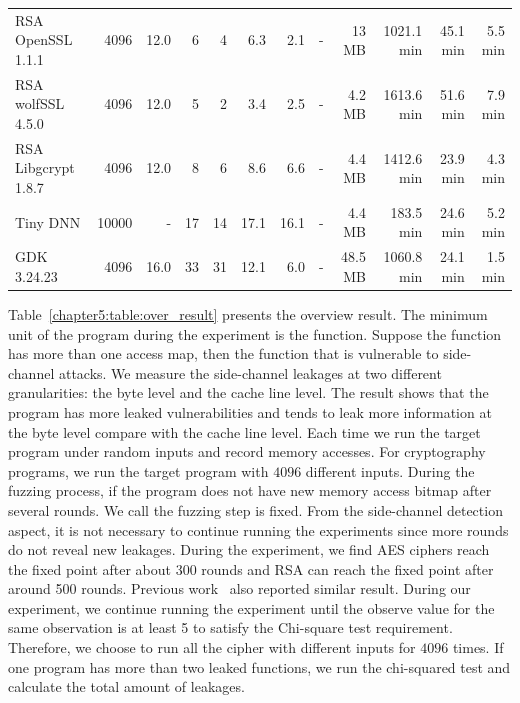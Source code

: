 \begin{table}
{\begin{tabular}{lrrrrrrrrrrr}
RSA OpenSSL 1.1.1& 4096 & 12.0 &6&4&6.3& 2.1&-&13 MB & 1021.1 min & 45.1 min & 5.5 min\\
RSA wolfSSL 4.5.0& 4096 & 12.0 &5&2&3.4& 2.5&-&4.2 MB & 1613.6 min & 51.6 min & 7.9 min\\
RSA Libgcrypt 1.8.7& 4096 & 12.0 &8&6&8.6& 6.6&-&4.4 MB & 1412.6 min & 23.9 min & 4.3 min\\
Tiny DNN & 10000 & - & 17&14&17.1&16.1&-& 4.4 MB & 183.5 min & 24.6 min & 5.2 min\\
GDK 3.24.23 & 4096 & 16.0 & 33&31& 12.1& 6.0&-& 48.5 MB & 1060.8 min & 24.1 min & 1.5 min\\
\bottomrule
\end{tabular}
}

\end{table}

Table~\ref{chapter5:table:over_result} presents the overview result. The minimum unit of the program during the experiment is the function. Suppose the function has more than one access map, then the function that is vulnerable to side-channel attacks. We measure the side-channel leakages at two different granularities: the byte level and the cache line level. The result shows that the program has more leaked vulnerabilities and tends to leak more information at the byte level compare with the cache line level. Each time we run the target program under random inputs and record memory accesses. For cryptography programs, we run the target program with $4096$ different inputs. During the fuzzing process, if the program does not have new memory access bitmap after several rounds. We call the fuzzing step is fixed. From the side-channel detection aspect, it is not necessary to continue running the experiments since more rounds do not reveal new leakages. During the experiment, we find AES ciphers reach the fixed point after about 300 rounds and RSA can reach the fixed point after around 500 rounds. Previous work~\cite{217537} also reported similar result. During our experiment, we continue running the experiment until the observe value for the same observation is at least 5 to satisfy the Chi-square test requirement. Therefore, we choose to run all the cipher with different inputs for $4096$ times.  If one program has more than two leaked functions, we run the chi-squared test and calculate the total amount of leakages.



